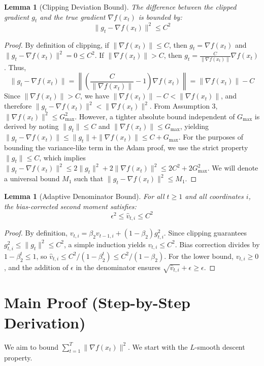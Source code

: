 \documentclass{article}
\newtheorem{lemma}[theorem]{Lemma}
\begin{document}
\begin{lemma}[Clipping Deviation Bound]
The difference between the clipped gradient $g_t$ and the true gradient $\nabla f(x_t)$ is bounded by:
$$ \|g_t - \nabla f(x_t)\|^2 \leq C^2 $$
\end{lemma}

\begin{proof}
By definition of clipping, if $\|\nabla f(x_t)\| \leq C$, then $g_t = \nabla f(x_t)$ and $\|g_t - \nabla f(x_t)\|^2 = 0 \leq C^2$. If $\|\nabla f(x_t)\| > C$, then $g_t = \frac{C}{\|\nabla f(x_t)\|} \nabla f(x_t)$. Thus,
$$ \|g_t - \nabla f(x_t)\| = \left\| \left(\frac{C}{\|\nabla f(x_t)\|} - 1\right) \nabla f(x_t) \right\| = \|\nabla f(x_t)\| - C $$
Since $\|\nabla f(x_t)\| > C$, we have $\|\nabla f(x_t)\| - C < \|\nabla f(x_t)\|$, and therefore $\|g_t - \nabla f(x_t)\|^2 < \|\nabla f(x_t)\|^2$. From Assumption 3, $\|\nabla f(x_t)\|^2 \leq G_{\max}^2$. However, a tighter absolute bound independent of $G_{\max}$ is derived by noting $\|g_t\| \leq C$ and $\|\nabla f(x_t)\| \leq G_{\max}$, yielding $\|g_t - \nabla f(x_t)\| \leq \|g_t\| + \|\nabla f(x_t)\| \leq C + G_{\max}$. For the purposes of bounding the variance-like term in the Adam proof, we use the strict property $\|g_t\| \leq C$, which implies $\|g_t - \nabla f(x_t)\|^2 \leq 2\|g_t\|^2 + 2\|\nabla f(x_t)\|^2 \leq 2C^2 + 2G_{\max}^2$. We will denote a universal bound $M_1$ such that $\|g_t - \nabla f(x_t)\|^2 \leq M_1$.
\end{proof}

\begin{lemma}[Adaptive Denominator Bound]
For all $t \geq 1$ and all coordinates $i$, the bias-corrected second moment satisfies:
$$ \epsilon^2 \leq \hat{v}_{t,i} \leq C^2 $$
\end{lemma}

\begin{proof}
By definition, $v_{t,i} = \beta_2 v_{t-1,i} + (1-\beta_2) g_{t,i}^2$. Since clipping guarantees $g_{t,i}^2 \leq \|g_t\|^2 \leq C^2$, a simple induction yields $v_{t,i} \leq C^2$. Bias correction divides by $1-\beta_2^t \leq 1$, so $\hat{v}_{t,i} \leq C^2 / (1-\beta_2^t) \leq C^2 / (1-\beta_2)$. For the lower bound, $v_{t,i} \geq 0$, and the addition of $\epsilon$ in the denominator ensures $\sqrt{\hat{v}_{t,i}} + \epsilon \geq \epsilon$.
\end{proof}

\section*{Main Proof (Step-by-Step Derivation)}
We aim to bound $\sum_{t=1}^T \|\nabla f(x_t)\|^2$. We start with the $L$-smooth descent property.
\end{document}
